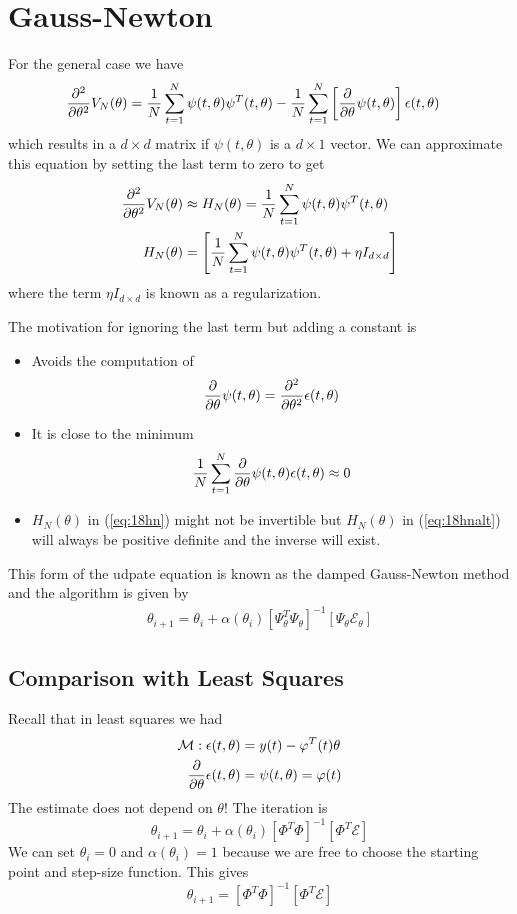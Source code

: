 \section{Gauss-Newton}
For the general case we have
\begin{align*}
\frac{\partial^2}{\partial\theta^2}V_N(\theta) &= \frac{1}{N}\sum_{t=1}^N\psi(t,\theta)\psi^T(t,\theta) - \frac{1}{N}\sum_{t=1}^N\left[\frac{\partial}{\partial\theta}\psi(t,\theta)\right]\epsilon(t,\theta)
\end{align*}
which results in a $d\times d$ matrix if $\psi(t,\theta)$ is a $d\times1$ vector. We can approximate this equation by setting the last term to zero to get
\begin{align}
\label{eq:18hn}
\frac{\partial^2}{\partial\theta^2}V_N(\theta) &\approx H_N(\theta) = \frac{1}{N}\sum_{t=1}^N\psi(t,\theta)\psi^T(t,\theta) \\
\label{eq:18hnalt}
H_N(\theta) &= \left[\frac{1}{N}\sum_{t=1}^N\psi(t,\theta)\psi^T(t,\theta) + \eta I_{d\times d}\right]
\end{align}
where the term $\eta I_{d\times d}$ is known as a regularization.

The motivation for ignoring the last term but adding a constant is
\begin{itemize}
\item Avoids the computation of
$$\frac{\partial}{\partial\theta}\psi(t,\theta) = \frac{\partial^2}{\partial\theta^2}\epsilon(t,\theta)$$
\item It is close to the minimum
$$\frac{1}{N}\sum_{t=1}^N\frac{\partial}{\partial\theta}\psi(t,\theta)\epsilon(t,\theta) \approx 0$$
\item $H_N(\theta)$ in (\ref{eq:18hn}) might not be invertible but $H_N(\theta)$ in (\ref{eq:18hnalt}) will always be positive definite and the inverse will exist.
\end{itemize}
This form of the udpate equation is known as the damped Gauss-Newton method and the algorithm is given by
\begin{align*}
\boxed{\theta_{i+1} = \theta_i + \alpha(\theta_i)\left[\Psi_\theta^T\Psi_\theta\right]^{-1} \left[\Psi_\theta\mathcal{E}_\theta\right]}
\end{align*}

\subsection{Comparison with Least Squares}
Recall that in least squares we had
\begin{align*}
\mathcal{M}: \epsilon(t,\theta) &= y(t) - \varphi^T(t)\theta \\
\frac{\partial}{\partial\theta}\epsilon(t,\theta) &= \psi(t,\theta) = \varphi(t)
\end{align*}
The estimate does not depend on $\theta$! The iteration is
$$\theta_{i+1} = \theta_i + \alpha(\theta_i)\left[\Phi^T\Phi\right]^{-1}\left[\Phi^T\mathcal{E}\right]$$
We can set $\theta_i=0$ and $\alpha(\theta_i)=1$ because we are free to choose the starting point and step-size function. This gives
$$\theta_{i+1} = \left[\Phi^T\Phi\right]^{-1}\left[\Phi^T\mathcal{E}\right]$$

